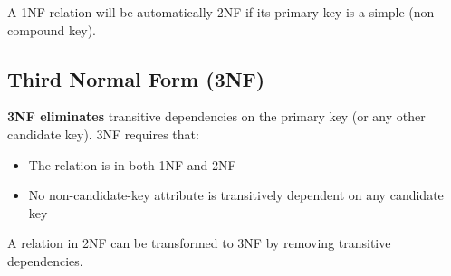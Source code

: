 \documentclass[slides]{pgnotes}
\begin{document}
A 1NF relation will be automatically 2NF if its primary key is a simple
(non-compound key).


\subsection{Third Normal Form (3NF)}\label{nf-2}

\textbf{3NF eliminates} transitive dependencies on the primary key (or any other candidate key).
3NF requires that:

\begin{itemize}
\item
  The relation is in both 1NF and 2NF
\item
  No non-candidate-key attribute is transitively dependent on any
  candidate key
\end{itemize}

A relation in 2NF can be transformed to 3NF by removing transitive
dependencies.




\end{document}
